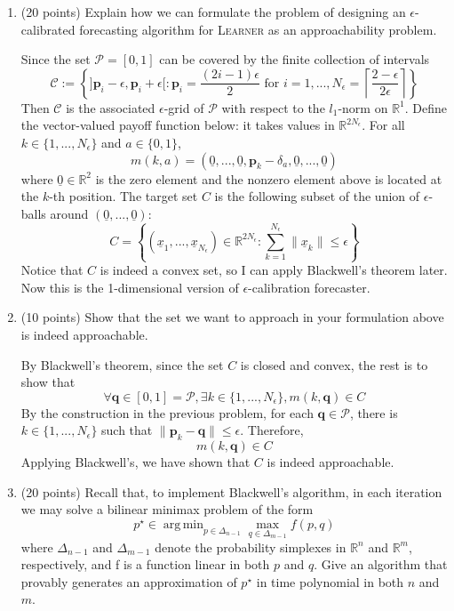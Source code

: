 \documentclass[a4paper, 12pt]{article}
\newcommand{\R}{\mathbb{R}}
\DeclareMathOperator*{\argmin}{arg\,min}
\begin{document}
\begin{enumerate}
    \item (20 points) Explain how we can formulate the problem of designing an $\epsilon$-calibrated forecasting algorithm for \textsc{Learner} as an approachability problem.
    \par {\color{blue} Since the set $\mathscr{P} = [0, 1]$ can be covered by the finite collection of intervals \[\mathscr{C} := \left\{]\mathbf{p}_i - \epsilon, \mathbf{p}_i + \epsilon[ : \mathbf{p}_i = \frac{(2i - 1)\epsilon}{2} \text{ for } i = 1, ..., N_\epsilon = \left\lceil \frac{2 - \epsilon}{2\epsilon}\right\rceil\right\}\]
    Then $\mathscr{C}$ is the associated $\epsilon$-grid of $\mathscr{P}$ with respect to the $l_1$-norm on $\R^1$. Define the vector-valued payoff function below: it takes values in $\R^{2N_\epsilon}$. For all $k \in \{1, ..., N_\epsilon\}$ and $a \in \{0, 1\}$, \[m(k, a) = (\underline{0}, ..., \underline{0}, \mathbf{p}_k - \delta_a, \underline{0}, ..., \underline{0})\]
    where $\underline{0} \in \R^2$ is the zero element and the nonzero element above is located at the $k$-th position. The target set $C$ is the following subset of the union of $\epsilon$-balls around $(\underline{0}, ..., \underline{0})$:
    \[C = \left\{ (\underline{x}_1, ..., \underline{x}_{N_\epsilon}) \in \R^{2N_\epsilon}: \sum_{k=1}^{N_\epsilon} \lVert \underline{x}_k \rVert \leq \epsilon \right\}\]
    Notice that $C$ is indeed a convex set, so I can apply Blackwell's theorem later.
    Now this is the 1-dimensional version of $\epsilon$-calibration forecaster.
    }
    \item (10 points) Show that the set we want to approach in your formulation above is indeed approachable.
    \par {\color{blue} By Blackwell's theorem, since the set $C$ is closed and convex, the rest is to show that
    \[ \forall \mathbf{q} \in [0, 1] = \mathscr{P}, \exists k \in \{1, ..., N_\epsilon\}, m(k, \mathbf{q}) \in C\]
    By the construction in the previous problem, for each $\mathbf{q} \in \mathscr{P}$, there is $k \in \{1, ..., N_\epsilon\}$ such that $\lVert \mathbf{p}_k - \mathbf{q}\rVert \leq \epsilon$. Therefore, \[m(k, \mathbf{q}) \in C\]
    Applying Blackwell's, we have shown that $C$ is indeed approachable.
    }

    \item (20 points) Recall that, to implement Blackwell's algorithm, in each iteration we may solve a bilinear minimax problem of the form
    \[p^\star \in \argmin_{p \in \Delta_{n-1}} \max_{q \in \Delta_{m-1}} f(p, q)\]
    where $\Delta_{n-1}$ and $\Delta_{m-1}$ denote the probability simplexes in $\R^n$ and $\R^m$, respectively, and f is a function linear in both $p$ and $q$. Give an algorithm that provably generates an approximation of $p^\star$ in time polynomial in both $n$ and $m$.
    \par {\color{blue} }
\end{enumerate}

\printbibliography
\end{document}
